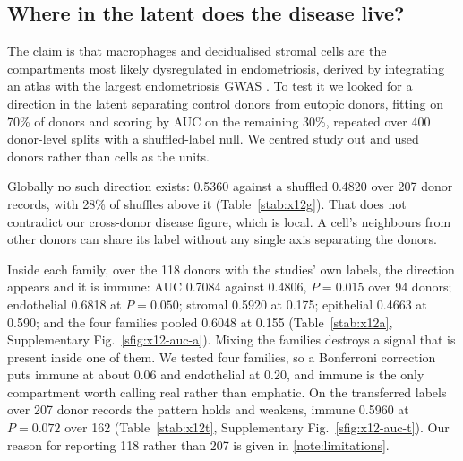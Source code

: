 \subsection{Where in the latent does the disease live?}

The claim is that macrophages and decidualised stromal cells are the
compartments most likely dysregulated in endometriosis, derived by
integrating an atlas with the largest endometriosis GWAS
\citep{mareckova2024heca}. To test it we looked for a direction in the
latent separating control donors from eutopic donors, fitting on 70\% of
donors and scoring by AUC on the remaining 30\%, repeated over 400
donor-level splits with a shuffled-label null. We centred study out and
used donors rather than cells as the units.

Globally no such direction exists: 0.5360 against a shuffled 0.4820 over
207 donor records, with 28\% of shuffles above it
(Table~\ref{stab:x12g}). That does not contradict our cross-donor disease
figure, which is local. A cell's neighbours from other donors can share its
label without any single axis separating the donors.

Inside each family, over the 118 donors with the studies' own labels, the
direction appears and it is immune: AUC 0.7084 against 0.4806,
$P = 0.015$ over 94 donors; endothelial 0.6818 at $P = 0.050$; stromal
0.5920 at 0.175; epithelial 0.4663 at 0.590; and the four families pooled
0.6048 at 0.155 (Table~\ref{stab:x12a},
Supplementary Fig.~\ref{sfig:x12-auc-a}). Mixing the families destroys a
signal that is present inside one of them. We tested four families, so a
Bonferroni correction puts immune at about 0.06 and endothelial at 0.20,
and immune is the only compartment worth calling real rather than
emphatic. On the transferred labels over 207 donor records the pattern
holds and weakens, immune 0.5960 at $P = 0.072$ over 162
(Table~\ref{stab:x12t}, Supplementary Fig.~\ref{sfig:x12-auc-t}). Our
reason for reporting 118 rather than 207 is given in
\ref{note:limitations}.

\begin{table}[t]
\centering
\caption[X12, the global direction]{\textbf{The global control-against-case
direction}, fitted and scored across donor-level splits.}
\label{stab:x12g}
\small

\end{table}

\begin{table}[t]
\centering
\caption[X12, direction within each family, own labels]{\textbf{The
disease direction within each family, studies' own labels}, 118 donors.
Interval is the 2.5th to 97.5th percentile over 400 splits.}
\label{stab:x12a}
\footnotesize

\end{table}

